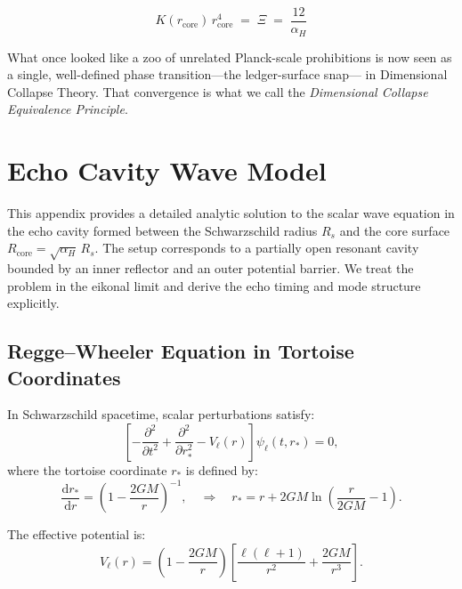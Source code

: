 \documentclass[a4paper, 12pt, oneside]{book}
\numberwithin{equation}{chapter}
\begin{document}
\[
\boxed{K(r_{\text{core}})\,r_{\text{core}}^{4} \;=\;
        \Xi \;=\;\frac{12}{\alpha_H}}
\]

What once looked like a zoo of unrelated Planck-scale prohibitions is
now seen as a single, well-defined phase transition—the ledger-surface snap—
in Dimensional Collapse Theory.  That convergence is what we call the  
\emph{Dimensional Collapse Equivalence Principle}.



\chapter{Echo Cavity Wave Model}
\label{app:EchoCavity}

\noindent
This appendix provides a detailed analytic solution to the scalar wave equation in the echo cavity \cite{Page1976}  
formed between the Schwarzschild radius \( R_s \) and the core surface \( R_{\text{core}} = \sqrt{\alpha_H}\,R_s \).  
The setup corresponds to a partially open resonant cavity bounded by an inner reflector and an outer potential barrier.  
We treat the problem in the eikonal limit and derive the echo timing and mode structure explicitly.

\section[Regge-Wheeler Equation]{Regge–Wheeler Equation in Tortoise Coordinates}
\label{sec:RWEquation}

In Schwarzschild spacetime, scalar perturbations satisfy:
\[
    \left[
        -\frac{\partial^2}{\partial t^2}
        + \frac{\partial^2}{\partial r_*^2}
        - V_\ell(r)
    \right]
    \psi_\ell(t, r_*) = 0,
\]
where the tortoise coordinate \( r_* \) is defined by:
\[
    \frac{\mathrm{d} r_*}{\mathrm{d} r}
    = \left(1 - \frac{2GM}{r}\right)^{-1},
    \quad \Rightarrow \quad
    r_* = r + 2GM \ln\left(\frac{r}{2GM} - 1\right).
\]

The effective potential is:
\[
    V_\ell(r) =
    \left(1 - \frac{2GM}{r}\right)
    \left[
        \frac{\ell(\ell + 1)}{r^2} + \frac{2GM}{r^3}
    \right].
\]
\end{document}
